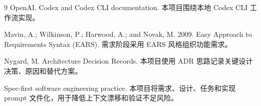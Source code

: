 \documentclass[11pt,a4paper]{article}
\begin{document}
\begin{thebibliography}{9}
OpenAI. Codex and Codex CLI documentation. 本项目围绕本地 Codex CLI 工作流实现。

Mavin, A.; Wilkinson, P.; Harwood, A.; and Novak, M. 2009. Easy Approach to Requirements Syntax (EARS). 需求阶段采用 EARS 风格组织功能需求。

Nygard, M. Architecture Decision Records. 本项目使用 ADR 思路记录关键设计决策、原因和替代方案。

Spec-first software engineering practice. 本项目将需求、设计、任务和实现 prompt 文件化，用于降低上下文漂移和验证不足风险。
\end{thebibliography}
\end{document}
